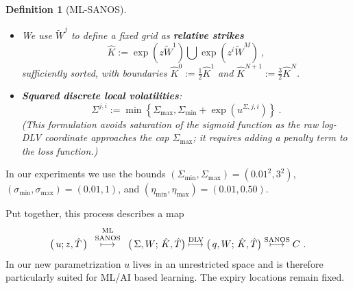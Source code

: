 \documentclass[11pt,a4paper]{article}
\newtheorem{definition}{Definition}[section]
\DeclareRobustCommand{\supstack}[2]{\stackrel{\mbox{{\scriptsize ${#1}$}}}{ {#2} }}     %
\begin{document}
\begin{definition}[ML-SANOS]
\begin{itemize}
\begin{equation}
            \end{equation}
            With these quantities define the \textbf{total volatilities}
             \begin{equation}\label{eq:totalW}
             \widetilde W^j := \sum_{\ell=1}^{j} \sigma^\ell \sqrt{\Delta\hat T^\ell}
             \qquad\mbox{and}\qquad
             W^j := \eta^{\mathrm f} \sigma^1 \sqrt{\Delta\hat T^1}\ + \eta^{\mathrm{term}} \sum_{\ell=2}^{j}  \sigma^\ell \sqrt{\Delta\hat T^\ell}\ .
             \end{equation}
        \item We use $\widetilde W^j$ to define a fixed grid as \textbf{relative strikes}
              \begin{equation}\label{eq:constructK}
                \hat K := \exp\left( z \widetilde W^1 \right) \bigcup \exp\left( z^i \widetilde W^M \right) \ ,
              \end{equation}
              sufficiently sorted, 
              with boundaries $\hat K^{0}:=\frac12 \hat K^{1}$ and $\hat K^{N+1} := \frac32 \hat K^{N}$.
        \item \textbf{Squared discrete local volatilities}:
              \begin{equation}\label{eq:defDLVdsq}
                 \Sigma^{j,i}
                 :=\min\!\left\{\Sigma_{\max},
                    \Sigma_{\min}+\exp(u^{\Sigma,j,i})\right\}\ .
              \end{equation}
              (This formulation avoids saturation of the sigmoid function as the raw log-DLV coordinate approaches the cap  $\Sigma_{\max}$;
              it requires adding a penalty term to the loss function.)

    \end{itemize}
\end{definition}
In our
experiments we use the bounds
$(\Sigma_{\min},\Sigma_{\max})=(0.01^2,3^2)$,
$(\sigma_{\min},\sigma_{\max})=(0.01,1)$, and
$(\eta_{\min},\eta_{\max})=(0.01,0.50)$. 

Put together, this process describes a map
    \begin{equation}
        \big(\,u;z,\hat T\,\big)  \supstack{
            \begin{array}{c}
                \mathrm{ML}\\
                \mathrm{SANOS}
                \end{array}
        }\longmapsto \big(\, \Sigma,W;\,\hat K,\hat T \big) 
        \supstack{\mathrm{DLV}}\longmapsto \big(\,q,W;\,\hat K,\hat T \big)  \supstack{\mathrm{SANOS}}\longmapsto C \ .
    \end{equation}
    In our new parametrization $u$ lives in an unrestricted space and is therefore
    particularly suited for ML/AI based learning.  The expiry locations remain fixed.
\end{document}
